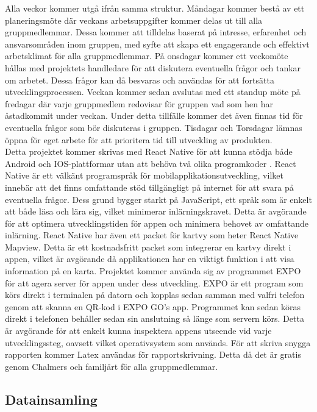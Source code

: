 Alla veckor kommer utgå ifrån samma struktur. Måndagar kommer bestå av  ett planeringsmöte där veckans arbetsuppgifter kommer delas ut till alla gruppmedlemmar. Dessa kommer att tilldelas baserat på intresse, erfarenhet och ansvarsområden inom gruppen, med syfte att skapa ett engagerande och effektivt arbetsklimat för alla gruppmedlemmar. På onsdagar kommer ett veckomöte hållas med projektets handledare för att diskutera eventuella frågor och tankar om arbetet. Dessa frågor kan då besvaras och användas för att fortsätta utvecklingsprocessen. Veckan kommer sedan avslutas med ett standup möte på fredagar där varje gruppmedlem redovisar för gruppen vad som hen har åstadkommit under veckan. Under detta tillfälle kommer det även finnas tid för eventuella frågor som bör diskuteras i gruppen. Tisdagar och Torsdagar lämnas öppna för eget arbete för att prioritera tid till utveckling av produkten.\\

Detta projektet kommer skrivas med React Native för att kunna stödja både Android och IOS-plattformar utan att behöva två olika programkoder \cite{react}. React Native är ett välkänt programspråk för mobilapplikationsutveckling, vilket innebär att det finns omfattande stöd tillgängligt på internet för att svara på eventuella frågor. Dess grund bygger starkt på JavaScript, ett språk som är enkelt att både läsa och lära sig, vilket minimerar inlärningskravet. Detta är avgörande för att optimera utvecklingstiden för appen och minimera behovet av omfattande inlärning. React Native har även ett packet för kartvy som heter React Native Mapview. Detta är ett kostnadsfritt packet som integrerar en kartvy direkt i appen, vilket är avgörande då applikationen har en viktigt funktion i att visa information på en karta. Projektet kommer använda sig av programmet EXPO för att agera server för appen under dess utveckling. EXPO är ett program som körs direkt i terminalen på datorn och kopplas sedan samman med valfri telefon genom att skanna en QR-kod i EXPO GO's app. Programmet kan sedan köras direkt i telefonen behåller sedan sin anslutning så länge som servern körs. Detta är avgörande för att enkelt kunna inspektera appens utseende vid varje utvecklingssteg, oavsett vilket operativsystem som används. För att skriva snygga rapporten kommer Latex användas för rapportskrivning. Detta då det är gratis genom Chalmers och familjärt för alla gruppmedlemmar.

\subsection{Datainsamling}

